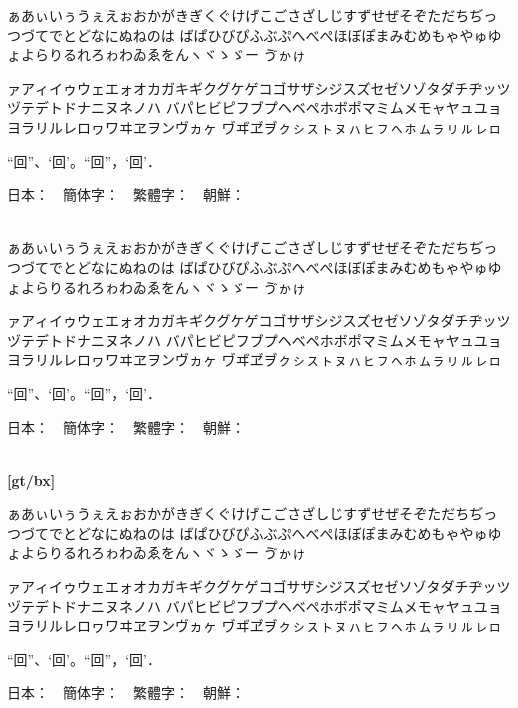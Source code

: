 \documentclass[a4paper,titlepage, draft]{\class}
\begin{document}
\makeatletter\if@deluxe
{\ltseries%
[mc/l]

ぁあぃいぅうぇえぉおかがきぎくぐけげこごさざしじすずせぜそぞただちぢっつづてでとどなにぬねのは
ばぱひびぴふぶぷへべぺほぼぽまみむめもゃやゅゆょよらりるれろゎわゐゑをんヽヾゝゞー
\ifuptexmode
ゔゕゖ
\fi

ァアィイゥウェエォオカガキギクグケゲコゴサザシジスズセゼソゾタダチヂッツヅテデトドナニヌネノハ
バパヒビピフブプヘベペホボポマミムメモャヤュユョヨラリルレロヮワヰヱヲンヴヵヶ
\ifuptexmode
ヷヸヹヺㇰㇱㇲㇳㇴㇵㇶㇷㇸㇹㇺㇻㇼㇽㇾㇿ
\fi

“回”、‘回’。“回”，‘回’．

日本：~~簡体字：~~繁體字：~~朝鮮：\\
~~%
~~%
}
\fi\makeatother

{\gtfamily
[gt/m]

ぁあぃいぅうぇえぉおかがきぎくぐけげこごさざしじすずせぜそぞただちぢっつづてでとどなにぬねのは
ばぱひびぴふぶぷへべぺほぼぽまみむめもゃやゅゆょよらりるれろゎわゐゑをんヽヾゝゞー
\ifuptexmode
ゔゕゖ
\fi

ァアィイゥウェエォオカガキギクグケゲコゴサザシジスズセゼソゾタダチヂッツヅテデトドナニヌネノハ
バパヒビピフブプヘベペホボポマミムメモャヤュユョヨラリルレロヮワヰヱヲンヴヵヶ
\ifuptexmode
ヷヸヹヺㇰㇱㇲㇳㇴㇵㇶㇷㇸㇹㇺㇻㇼㇽㇾㇿ
\fi

“回”、‘回’。“回”，‘回’．

日本：~~簡体字：~~繁體字：~~朝鮮：\\
~~%
~~%
}

{\gtfamily\bfseries%
[gt/bx]

ぁあぃいぅうぇえぉおかがきぎくぐけげこごさざしじすずせぜそぞただちぢっつづてでとどなにぬねのは
ばぱひびぴふぶぷへべぺほぼぽまみむめもゃやゅゆょよらりるれろゎわゐゑをんヽヾゝゞー
\ifuptexmode
ゔゕゖ
\fi

ァアィイゥウェエォオカガキギクグケゲコゴサザシジスズセゼソゾタダチヂッツヅテデトドナニヌネノハ
バパヒビピフブプヘベペホボポマミムメモャヤュユョヨラリルレロヮワヰヱヲンヴヵヶ
\ifuptexmode
ヷヸヹヺㇰㇱㇲㇳㇴㇵㇶㇷㇸㇹㇺㇻㇼㇽㇾㇿ
\fi

“回”、‘回’。“回”，‘回’．

日本：~~簡体字：~~繁體字：~~朝鮮：\\
~~%
~~%
}
\end{document}
